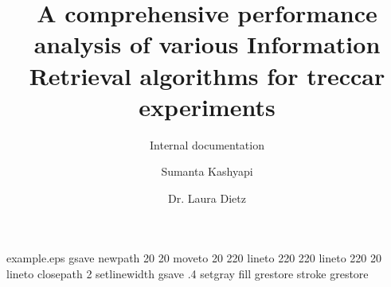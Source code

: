 %
%
%
%
%
\begin{filecontents*}{example.eps}
gsave
newpath
  20 20 moveto
  20 220 lineto
  220 220 lineto
  220 20 lineto
closepath
2 setlinewidth
gsave
  .4 setgray fill
grestore
stroke
grestore
\end{filecontents*}
%
\RequirePackage{fix-cm}
%
\documentclass[smallextended]{svjour3}       %
%
\smartqed  %
%
\usepackage{graphicx}
\usepackage{amssymb}
\usepackage{amsmath}
%
%
\usepackage{fixltx2e}
\usepackage[]{algorithm2e}
%
%
%


\title{A comprehensive performance analysis of various Information Retrieval algorithms for treccar experiments%
}
\subtitle{Internal documentation}


\author{Sumanta Kashyapi         \and
        Dr. Laura Dietz %
}


